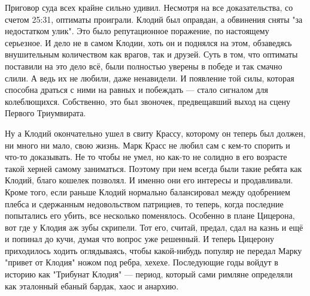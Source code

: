 Приговор суда всех крайне сильно удивил. Несмотря на все доказательства, со счетом 25:31, оптиматы проиграли. Клодий был оправдан, а обвинения сняты "за недостатком улик". Это было репутационное поражение, по настоящему серьезное. И дело не в самом Клодии, хоть он и поднялся на этом, обзаведясь внушительным количеством как врагов, так и друзей. Суть в том, что оптиматы поставили на это дело всё, были полностью уверены в победе и так смачно слили. А ведь их не любили, даже ненавидели. И появление той силы, которая способна драться с ними на равных и побеждать — стало сигналом для колеблющихся. Собственно, это был звоночек, предвещавший выход на сцену Первого Триумвирата.


Ну а Клодий окончательно ушел в свиту Крассу, которому он теперь был должен, ни много ни мало, свою жизнь. Марк Красс не любил сам с кем-то спорить и что-то доказывать. Не то чтобы не умел, но как-то не солидно в его возрасте такой херней самому заниматься. Поэтому при нем всегда были такие ребята как Клодий, благо кошелек позволял. И именно они его интересы и продавливали. Кроме того, если раньше Клодий нормально балансировал между одобрением плебса и сдержанным недовольством патрициев, то теперь, когда последние попытались его убить, все несколько поменялось. Особенно в плане Цицерона, вот где у Клодия аж зубы скрипели. Тот его, считай, предал, сдал на казнь и ещё и попинал до кучи, думая что вопрос уже решенный. И теперь Цицерону приходилось ходить оглядываясь, чтобы какой-нибудь популяр не передал Марку "привет от Клодия" ножом под ребра, хехехе. Последующие годы войдут в историю как "Трибунат Клодия" — период, который сами римляне определяли как эталонный ебаный бардак, хаос и анархию.


